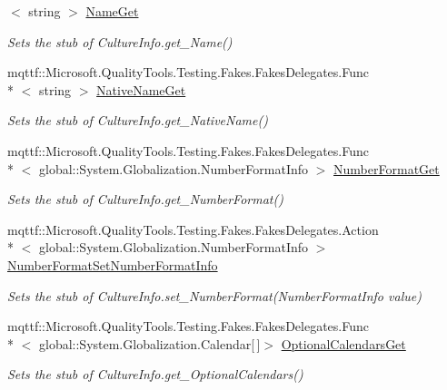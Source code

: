 \begin{DoxyCompactItemize}
$<$ string $>$ \hyperlink{class_system_1_1_globalization_1_1_fakes_1_1_stub_culture_info_a858f0c485e2ced6ee70658980cbacef4}{Name\-Get}
\begin{DoxyCompactList}\small\item\em Sets the stub of Culture\-Info.\-get\-\_\-\-Name()\end{DoxyCompactList}\item 
mqttf\-::\-Microsoft.\-Quality\-Tools.\-Testing.\-Fakes.\-Fakes\-Delegates.\-Func\\*
$<$ string $>$ \hyperlink{class_system_1_1_globalization_1_1_fakes_1_1_stub_culture_info_a35c1a9089b00ad3bcf8a3ce808b2bb68}{Native\-Name\-Get}
\begin{DoxyCompactList}\small\item\em Sets the stub of Culture\-Info.\-get\-\_\-\-Native\-Name()\end{DoxyCompactList}\item 
mqttf\-::\-Microsoft.\-Quality\-Tools.\-Testing.\-Fakes.\-Fakes\-Delegates.\-Func\\*
$<$ global\-::\-System.\-Globalization.\-Number\-Format\-Info $>$ \hyperlink{class_system_1_1_globalization_1_1_fakes_1_1_stub_culture_info_a2f41a53606509e599eb9d5b52a87b13f}{Number\-Format\-Get}
\begin{DoxyCompactList}\small\item\em Sets the stub of Culture\-Info.\-get\-\_\-\-Number\-Format()\end{DoxyCompactList}\item 
mqttf\-::\-Microsoft.\-Quality\-Tools.\-Testing.\-Fakes.\-Fakes\-Delegates.\-Action\\*
$<$ global\-::\-System.\-Globalization.\-Number\-Format\-Info $>$ \hyperlink{class_system_1_1_globalization_1_1_fakes_1_1_stub_culture_info_a7501dbaae51d2c49262a519b05a0bf6a}{Number\-Format\-Set\-Number\-Format\-Info}
\begin{DoxyCompactList}\small\item\em Sets the stub of Culture\-Info.\-set\-\_\-\-Number\-Format(\-Number\-Format\-Info value)\end{DoxyCompactList}\item 
mqttf\-::\-Microsoft.\-Quality\-Tools.\-Testing.\-Fakes.\-Fakes\-Delegates.\-Func\\*
$<$ global\-::\-System.\-Globalization.\-Calendar\mbox{[}$\,$\mbox{]}$>$ \hyperlink{class_system_1_1_globalization_1_1_fakes_1_1_stub_culture_info_a157f4e7d7b98307b4d78da0fb6e00830}{Optional\-Calendars\-Get}
\begin{DoxyCompactList}\small\item\em Sets the stub of Culture\-Info.\-get\-\_\-\-Optional\-Calendars()\end{DoxyCompactList}\item 

\end{DoxyCompactItemize}
